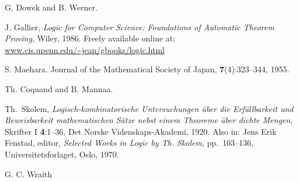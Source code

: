 \documentclass[10pt,a4paper]{article}
\begin{document}
\begin{thebibliography}{9}

G. Dowek and B. Werner.

J. Gallier, 
\newblock\emph{Logic for Computer Science: Foundations of Automatic Theorem Proving},
Wiley, 1986. Freely available online at: \url{www.cis.upenn.edu/~jean/gbooks/logic.html}

S. Maehara.
Journal of the Mathematical Society of Japan, \textbf{7}(4):323--344, 1955.

Th. Coquand and B. Mannaa.

Th.~Skolem,
\newblock\emph{Logisch-kombinatorische Untersuchungen \"{u}ber
die Erf\"{u}llbarkeit %
und Beweisbarkeit mathematischen S\"{a}tze
nebst einem Theoreme \"{u}ber dichte Mengen},
{Skrifter} I \textbf{4}:1--36, Det Norske Videnskaps-Akademi, 1920.
\newblock Also in: Jens Erik Fenstad, editor,
\emph{Selected Works in Logic by Th. Skolem}, pp.~103--136,
Universitetsforlaget, Oslo, 1970.

G. C. Wraith

\end{thebibliography}
\end{document}
